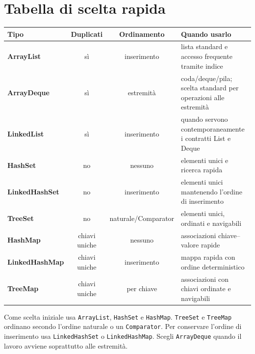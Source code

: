 ﻿\documentclass[10pt,a4paper]{article}
\newcommand{\cmd}[1]{\texttt{#1}}
\newcommand{\topicsection}[1]{\Needspace{12\baselineskip}\section{#1}}
\newenvironment{topicblock}{%
  \par\medskip\noindent\begin{minipage}{\textwidth}%
}{%
  \end{minipage}\par\medskip%
}
\begin{document}
\begin{topicblock}
\topicsection{Tabella di scelta rapida}

\renewcommand{\arraystretch}{1.28}
\begin{tabularx}{\textwidth}{>{\bfseries}l c c X}
\toprule
Tipo & Duplicati & Ordinamento & Quando usarlo \\
\midrule
ArrayList & sì & inserimento & lista standard e accesso frequente tramite indice \\
ArrayDeque & sì & estremità & coda/deque/pila; scelta standard per operazioni alle estremità \\
LinkedList & sì & inserimento & quando servono contemporaneamente i contratti List e Deque \\
HashSet & no & nessuno & elementi unici e ricerca rapida \\
LinkedHashSet & no & inserimento & elementi unici mantenendo l'ordine di inserimento \\
TreeSet & no & naturale/Comparator & elementi unici, ordinati e navigabili \\
HashMap & chiavi uniche & nessuno & associazioni chiave--valore rapide \\
LinkedHashMap & chiavi uniche & inserimento & mappa rapida con ordine deterministico \\
TreeMap & chiavi uniche & per chiave & associazioni con chiavi ordinate e navigabili \\
\bottomrule
\end{tabularx}

\vspace{6pt}
\begin{tcolorbox}[colback=softorange,colframe=orange!70!black,title={Regola pratica},fonttitle=\bfseries]
Come scelta iniziale usa \cmd{ArrayList}, \cmd{HashSet} e \cmd{HashMap}.
\cmd{TreeSet} e \cmd{TreeMap} ordinano secondo l'ordine naturale o un
\cmd{Comparator}. Per conservare l'ordine di inserimento usa
\cmd{LinkedHashSet} o \cmd{LinkedHashMap}. Scegli \cmd{ArrayDeque} quando il
lavoro avviene soprattutto alle estremità.
\end{tcolorbox}

\end{topicblock}
\end{document}
